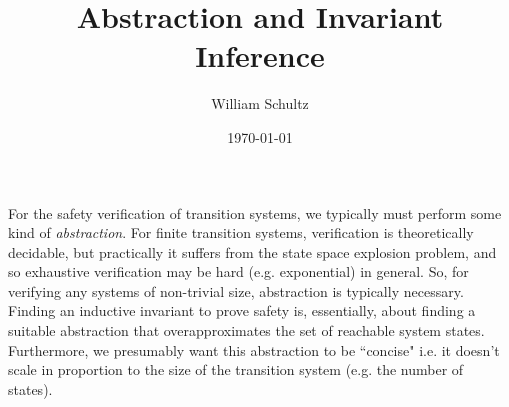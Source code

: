 \documentclass[10pt]{article}
\begin{document}
\title{Abstraction and Invariant Inference}
\author{William Schultz}
\date{\today}

\maketitle










For the safety verification of transition systems, we typically must perform some kind of \textit{abstraction}. For finite transition systems, verification is theoretically decidable, but practically it suffers from the state space explosion problem, and so exhaustive verification may be hard (e.g. exponential) in general. So, for verifying any systems of non-trivial size, abstraction is typically necessary. Finding an inductive invariant to prove safety is, essentially, about finding a suitable abstraction that overapproximates the set of reachable system states. Furthermore, we presumably want this abstraction to be ``concise" i.e. it doesn't scale in proportion to the size of the transition system (e.g. the number of states).
\end{document}

